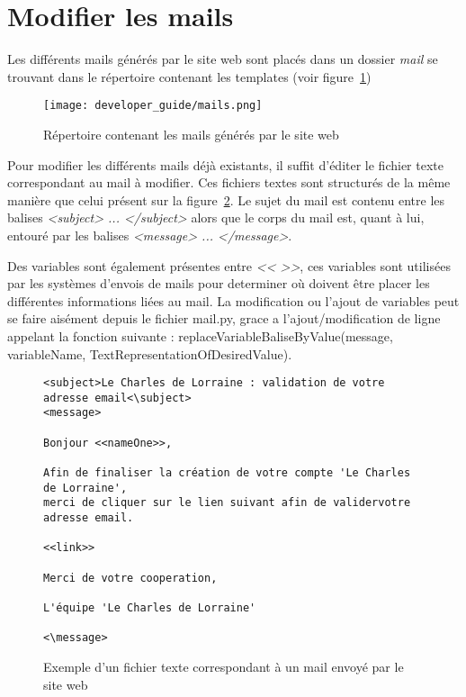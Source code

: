 \section{Modifier les mails}

Les différents mails générés par le site web sont placés dans un dossier \textit{mail} se trouvant dans le répertoire contenant les templates (voir figure~\ref{fig:Répertoire contenant les mails générés par le site web})

\begin{figure}[!ht]
    \centering
    \texttt{[image: developer\_guide/mails.png]}
    \caption{Répertoire contenant les mails générés par le site web}
    \label{fig:Répertoire contenant les mails générés par le site web}
\end{figure}
\FloatBarrier

Pour modifier les différents mails déjà existants, il suffit d'éditer le fichier texte correspondant au mail à modifier. Ces fichiers textes sont structurés de la même manière que celui présent sur la figure~\ref{fig:Exemple d'un fichier texte correspondant à un mail envoyé par le site web}. Le sujet du mail est contenu entre les balises \textit{<subject> ... </subject>} alors que le corps du mail est, quant à lui, entouré par les balises \textit{<message> ... </message>}.\newline

Des variables sont également présentes entre \textit{<< >>}, ces variables sont 
utilisées par les systèmes d'envois de mails pour determiner où doivent être placer 
les différentes informations liées au mail. La modification ou l'ajout de variables 
peut se faire aisément depuis le fichier mail.py, grace a l'ajout/modification de 
ligne appelant la fonction suivante : replaceVariableBaliseByValue(message, 
variableName, TextRepresentationOfDesiredValue).

\begin{figure}[!ht]
\begin{framed}
\begin{verbatim}
<subject>Le Charles de Lorraine : validation de votre adresse email<\subject>
<message>

Bonjour <<nameOne>>,

Afin de finaliser la création de votre compte 'Le Charles de Lorraine',  
merci de cliquer sur le lien suivant afin de validervotre adresse email.

<<link>>
	
Merci de votre cooperation,

L'équipe 'Le Charles de Lorraine'

<\message>
\end{verbatim}
\end{framed}
    \caption{Exemple d'un fichier texte correspondant à un mail envoyé par le site web}
    \label{fig:Exemple d'un fichier texte correspondant à un mail envoyé par le site web}
\end{figure}
\FloatBarrier

